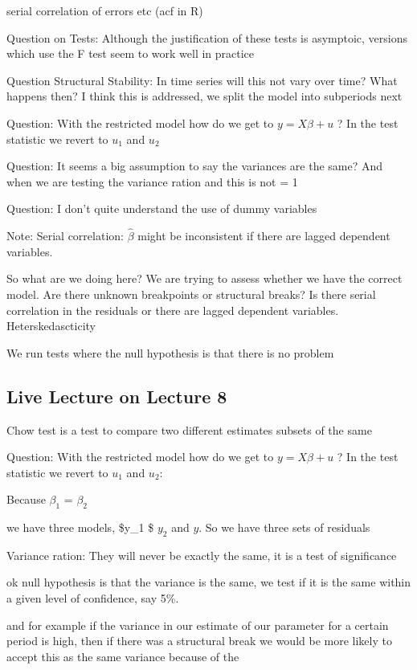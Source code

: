 \documentclass[]{article}
\begin{document}
serial correlation of errors etc (acf in R)

Question on Tests: Although the justification of these tests is
asymptoic, versions which use the F test seem to work well in practice

Question Structural Stability: In time series will this not vary over
time? What happens then? I think this is addressed, we split the model
into subperiods next

Question: With the restricted model how do we get to \(y = X \beta + u\)
? In the test statistic we revert to \(u_1\) and \(u_2\)

Question: It seems a big assumption to say the variances are the same?
And when we are testing the variance ration and this is not = 1

Question: I don't quite understand the use of dummy variables

Note: Serial correlation: \(\hat\beta\) might be inconsistent if there
are lagged dependent variables.

So what are we doing here? We are trying to assess whether we have the
correct model. Are there unknown breakpoints or structural breaks? Is
there serial correlation in the residuals or there are lagged dependent
variables. Heterskedascticity

We run tests where the null hypothesis is that there is no problem

\subsection{Live Lecture on Lecture 8}\label{live-lecture-on-lecture-8}

Chow test is a test to compare two different estimates subsets of the
same

Question: With the restricted model how do we get to \(y = X \beta + u\)
? In the test statistic we revert to \(u_1\) and \(u_2\):

Because \(\beta_1\) = \(\beta_2\)

we have three models, \$y\_1 \$ \(y_2\) and \(y\). So we have three sets
of residuals

Variance ration: They will never be exactly the same, it is a test of
significance

ok null hypothesis is that the variance is the same, we test if it is
the same within a given level of confidence, say 5\%.

and for example if the variance in our estimate of our parameter for a
certain period is high, then if there was a structural break we would be
more likely to accept this as the same variance because of the
\end{document}
